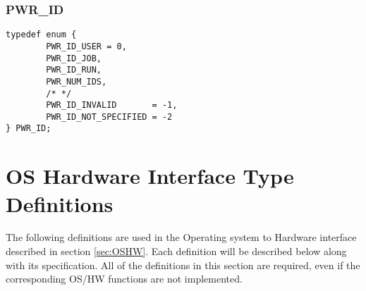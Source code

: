 \documentclass[12pt]{report} %
\begin{document}



\subsubsection{PWR_ID}\label{type:ID}
\begin{center}
\begin{minipage}{.95\linewidth}%
\begin{lstlisting}
typedef enum {
        PWR_ID_USER = 0,
        PWR_ID_JOB,
        PWR_ID_RUN,
        PWR_NUM_IDS,
        /* */
        PWR_ID_INVALID       = -1,
        PWR_ID_NOT_SPECIFIED = -2
} PWR_ID;
\end{lstlisting}
\end{minipage}
\end{center}

\section{OS Hardware Interface Type Definitions}\label{sec:OSHWTypeDefinitions}
The following definitions are used in the Operating system to Hardware interface described in section \ref{sec:OSHW}.
Each definition will be described below along with its specification. All of the definitions in this section are required, even if the corresponding OS/HW functions are not implemented. 
\end{document}
